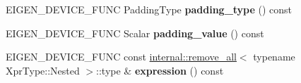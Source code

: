 \begin{DoxyCompactItemize}
E\+I\+G\+E\+N\+\_\+\+D\+E\+V\+I\+C\+E\+\_\+\+F\+U\+NC Padding\+Type {\bfseries padding\+\_\+type} () const
\item 
\mbox{\label{class_eigen_1_1_tensor_image_patch_op_aef3b70902d79ad27971e9fe6741d7ba7}} 
E\+I\+G\+E\+N\+\_\+\+D\+E\+V\+I\+C\+E\+\_\+\+F\+U\+NC Scalar {\bfseries padding\+\_\+value} () const
\item 
\mbox{\label{class_eigen_1_1_tensor_image_patch_op_ae119ac0377ce27652a83f58a8bbdfd56}} 
E\+I\+G\+E\+N\+\_\+\+D\+E\+V\+I\+C\+E\+\_\+\+F\+U\+NC const \hyperlink{struct_eigen_1_1internal_1_1remove__all}{internal\+::remove\+\_\+all}$<$ typename Xpr\+Type\+::\+Nested $>$\+::type \& {\bfseries expression} () const
\end{DoxyCompactItemize}
